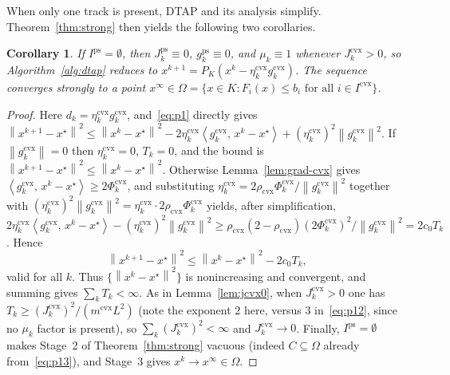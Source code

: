 \documentclass[]{interact}
\theoremstyle{plain}
\newtheorem{corollary}[theorem]{Corollary}
\theoremstyle{definition}
\theoremstyle{remark}
\newcommand{\norm}[1]{\left\lVert #1 \right\rVert}
\newcommand{\inner}[2]{\left\langle #1,\, #2 \right\rangle}
\newcommand{\cvx}{\mathrm{cvx}}
\newcommand{\ps}{\mathrm{ps}}
\newcommand{\dtap}{\textsc{DTAP}}
\begin{document}
When only one track is present, \dtap{} and its analysis simplify. Theorem~\ref{thm:strong} then yields the following two corollaries.

\begin{corollary}\label{cor:cvx}
If $I^{\ps}=\emptyset$, then $J^{\ps}_k\equiv0$, $g^{\ps}_k\equiv0$, and $\mu_k\equiv1$ whenever $J^{\cvx}_k>0$, so Algorithm~\ref{alg:dtap} reduces to $x^{k+1}=P_K(x^k-\eta^{\cvx}_k g^{\cvx}_k)$. The sequence converges strongly to a point $x^\infty\in\Omega=\{x\in K:F_i(x)\le b_i\text{ for all }i\in I^{\cvx}\}$.
\end{corollary}
\begin{proof}
Here $d_k=\eta^{\cvx}_k g^{\cvx}_k$, and~\eqref{eq:p1} directly gives $\norm{x^{k+1}-x^\star}^2\le\norm{x^k-x^\star}^2-2\eta^{\cvx}_k\inner{g^{\cvx}_k}{x^k-x^\star}+(\eta^{\cvx}_k)^2\norm{g^{\cvx}_k}^2$. If $\norm{g^{\cvx}_k}=0$ then $\eta^{\cvx}_k=0$, $T_k=0$, and the bound is $\norm{x^{k+1}-x^\star}^2\le\norm{x^k-x^\star}^2$. Otherwise Lemma~\ref{lem:grad-cvx} gives $\inner{g^{\cvx}_k}{x^k-x^\star}\ge2\Phi^{\cvx}_k$, and substituting $\eta^{\cvx}_k=2\rho_{\cvx}\Phi^{\cvx}_k/\norm{g^{\cvx}_k}^2$ together with $(\eta^{\cvx}_k)^2\norm{g^{\cvx}_k}^2=\eta^{\cvx}_k\cdot2\rho_{\cvx}\Phi^{\cvx}_k$ yields, after simplification, $2\eta^{\cvx}_k\inner{g^{\cvx}_k}{x^k-x^\star}-(\eta^{\cvx}_k)^2\norm{g^{\cvx}_k}^2\ge\rho_{\cvx}(2-\rho_{\cvx})(2\Phi^{\cvx}_k)^2/\norm{g^{\cvx}_k}^2=2c_0T_k$. Hence
\begin{equation}\label{eq:p15}
\norm{x^{k+1}-x^\star}^2\le\norm{x^k-x^\star}^2-2c_0T_k ,
\end{equation}
valid for all $k$. Thus $\{\norm{x^k-x^\star}^2\}$ is nonincreasing and convergent, and summing gives $\sum_k T_k<\infty$. As in Lemma~\ref{lem:jcvx0}, when $J^{\cvx}_k>0$ one has $T_k\ge(J^{\cvx}_k)^2/(m^{\cvx}L^2)$ (note the exponent $2$ here, versus $3$ in~\eqref{eq:p12}, since no $\mu_k$ factor is present), so $\sum_k(J^{\cvx}_k)^2<\infty$ and $J^{\cvx}_k\to0$. Finally, $I^{\ps}=\emptyset$ makes Stage~2 of Theorem~\ref{thm:strong} vacuous (indeed $C\subseteq\Omega$ already from~\eqref{eq:p13}), and Stage~3 gives $x^k\to x^\infty\in\Omega$.
\end{proof}
\end{document}

